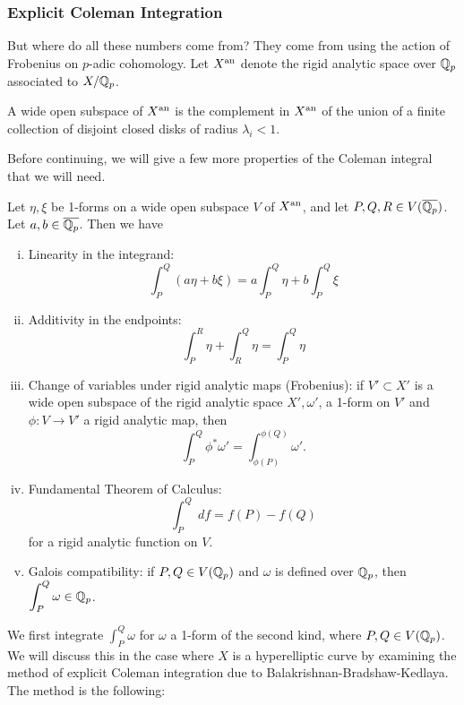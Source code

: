 \subsubsection{Explicit Coleman Integration}

But where do all these numbers come from? They come from using the action of Frobenius on $p$-adic cohomology. Let $X^{\text{an}}$ denote the rigid analytic space over $\mathbb{Q}_p$ associated to $X/\mathbb{Q}_p$. 


\begin{dfn}
A wide open subspace of $X^{\text{an}}$ is the complement in $X^{\text{an}}$ of the union of a finite collection of disjoint closed disks of radius $\lambda_i < 1$.
\end{dfn}


Before continuing, we will give a few more properties of the Coleman integral that we will need. 


\begin{thm}[Coleman]
Let $\eta, \xi$ be 1-forms on a wide open subspace $V$ of $X^{\text{an}}$, and let $P,Q, R \in V(\overline{\mathbb{Q}_p})$. Let $a,b \in \overline{\mathbb{Q}_p}$. Then we have 

\begin{enumerate}[(i)]
\item Linearity in the integrand:
	\[
	\int_P^Q (a\eta + b \xi)= a \int_P^Q \eta + b \int_P^Q \xi
	\]

\item Additivity in the endpoints:
	\[
	\int_P^R \eta + \int_R^Q \eta= \int_P^Q \eta
	\]

\item Change of variables under rigid analytic maps (Frobenius): if $V' \subset X'$ is a wide open subspace of the rigid analytic space $X', \omega'$, a 1-form on $V'$ and $\phi: V \to V'$ a rigid analytic map, then
	\[
	\int_P^Q \phi^* \omega'= \int_{\phi(P)}^{\phi(Q)} \omega'. 
	\]

\item Fundamental Theorem of Calculus:
	\[
	\int_P^Q \;df= f(P) - f(Q)
	\]
for a rigid analytic function on $V$.

\item Galois compatibility: if $P,Q \in V(\mathbb{Q}_p)$ and $\omega$ is defined over $\mathbb{Q}_p$, then $\displaystyle \int_P^Q \omega \in \mathbb{Q}_p$. 
\end{enumerate}
\end{thm}


We first integrate $\int_P^Q \omega$ for $\omega$ a 1-form of the second kind, where $P, Q \in V(\mathbb{Q}_p)$. We will discuss this in the case where $X$ is a hyperelliptic curve by examining the method of explicit Coleman integration due to Balakrishnan-Bradshaw-Kedlaya. The method is the following: \par\vspace{\baselineskip}


